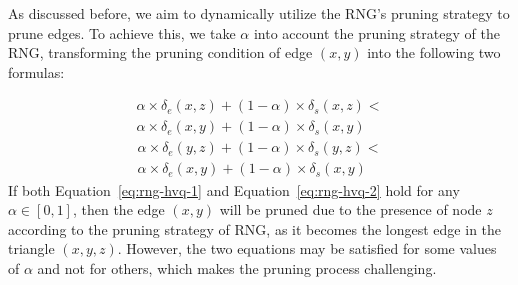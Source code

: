 
As discussed before, we aim to dynamically utilize the RNG’s pruning strategy to prune edges. %
To achieve this, we take $\alpha$ into account the pruning strategy of the RNG, transforming the pruning condition of edge $(x, y)$ into the following two formulas:





\begin{equation}
\begin{aligned}
\alpha \times \delta_e(x, z) + (1 - \alpha) \times \delta_s(x, z) < \\ 
\alpha \times \delta_e(x, y) + (1 - \alpha) \times \delta_s(x, y)
\end{aligned}
\label{eq:rng-hvq-1}
\end{equation}
\begin{equation}
\begin{aligned}
\alpha \times \delta_e(y, z) + (1 - \alpha) \times \delta_s(y, z) < \\
\alpha \times \delta_e(x, y) + (1 - \alpha) \times \delta_s(x, y)
\end{aligned}
\label{eq:rng-hvq-2}
\end{equation}
If both Equation~\ref{eq:rng-hvq-1} and Equation~\ref{eq:rng-hvq-2} hold for any $\alpha \in [0, 1]$, then the edge $(x, y)$ will be pruned due to the presence of node $z$ according to the pruning strategy of RNG, as it becomes the longest edge in the triangle $(x, y, z)$. However, the two equations may be satisfied for some values of $\alpha$ and not for others, which makes the pruning process challenging.


